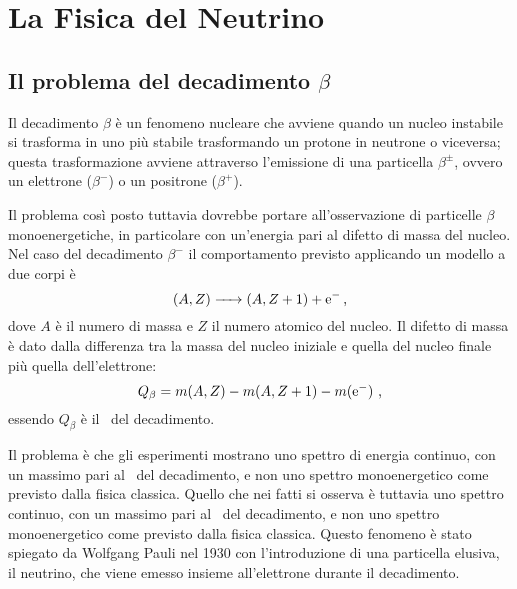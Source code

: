 
\chapter{La Fisica del Neutrino}
    \section{Il problema del decadimento \texorpdfstring{$\beta$}{beta}}
        Il decadimento $\beta$ è un fenomeno nucleare che avviene quando un nucleo instabile si trasforma in uno più stabile trasformando un protone in neutrone o viceversa; questa trasformazione avviene attraverso l'emissione di una particella $\beta^\pm$, ovvero un elettrone ($\beta^-$) o un positrone ($\beta^+$).

        Il problema così posto tuttavia dovrebbe portare all'osservazione di particelle $\beta$ monoenergetiche, in particolare con un'energia pari al difetto di massa del nucleo. Nel caso del decadimento $\beta^-$ il comportamento previsto applicando un modello a due corpi è
        \begin{equation*}
            \ce{$\pqty{A, Z}$ -> $\pqty{A, Z+1}$ + e^-}
            \mycomma
        \end{equation*}
        dove $A$ è il numero di massa e $Z$ il numero atomico del nucleo. Il difetto di massa è dato dalla differenza tra la massa del nucleo iniziale e quella del nucleo finale più quella dell'elettrone: 
        \begin{equation*}
            Q_\beta = m\pqty{A, Z} - m\pqty{A, Z+1} - m\pqty*{\txt{e}^-}
            \mycomma
        \end{equation*}
        essendo $Q_\beta$ è il \Qv\ del decadimento. 
        
        Il problema è che gli esperimenti mostrano uno spettro di energia continuo, con un massimo pari al \Qv\ del decadimento, e non uno spettro monoenergetico come previsto dalla fisica classica.
        Quello che nei fatti si osserva è tuttavia uno spettro continuo, con un massimo pari al \Qv\ del decadimento, e non uno spettro monoenergetico come previsto dalla fisica classica. Questo fenomeno è stato spiegato da Wolfgang Pauli nel 1930 con l'introduzione di una particella elusiva, il neutrino, che viene emesso insieme all'elettrone durante il decadimento.
        
        


